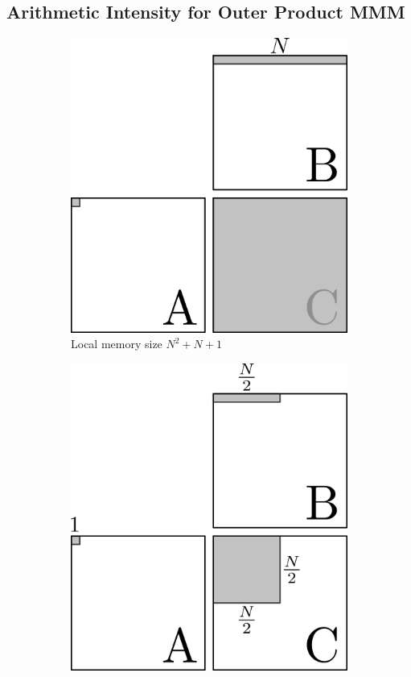 \documentclass[a4 paper]{article}
\begin{document}
\subsection*{Arithmetic Intensity for Outer Product MMM}

\begin{figure}[H]
\centering
\begin{subfigure}{.5\textwidth}
  \centering
  \includegraphics[scale=1]{figures/outer_mmm_n2.png}
  \caption{Local memory size $N^2 + N + 1$}
  \label{fig:outermm_n2}
\end{subfigure}%
\begin{subfigure}{.5\textwidth}
  \centering
  \includegraphics[scale=1]{figures/outer_mmm_n2_4.png}

\end{subfigure}
\end{figure}
\end{document}
